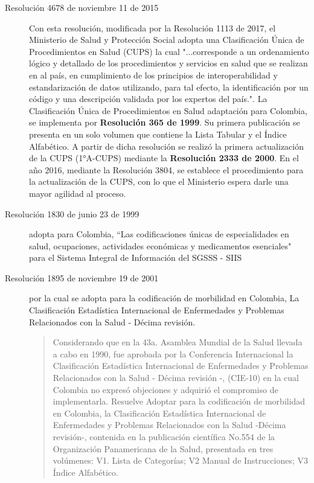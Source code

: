 \begin{description}
\item[Resolución 4678 de noviembre 11 de 2015] Con esta resolución, modificada por la Resolución 1113 de 2017, el Ministerio de Salud y Protección Social adopta una Clasificación Única de Procedimientos en Salud (CUPS) la cual "...corresponde a un ordenamiento lógico y detallado de los procedimientos y servicios en salud que se realizan en al país, en cumplimiento de los principios de interoperabilidad y estandarización de datos utilizando, para tal efecto, la identificación por un código y una descripción validada por los expertos del país."\cite{minsalud4678}. La Clasificación Única de Procedimientos en Salud adaptación para Colombia, se implementa por \textbf{Resolución 365 de 1999}. Su primera publicación se presenta en un solo volumen que contiene la Lista Tabular y el Índice Alfabético. A partir de dicha resolución se realizó la primera actualización de la CUPS (1°A-CUPS) mediante la \textbf{Resolución 2333 de 2000}. En el año 2016, mediante la Resolución 3804, se establece el procedimiento para la actualización de la CUPS, con lo que el Ministerio espera darle una mayor agilidad al proceso.

\item[Resolución 1830 de junio 23 de 1999] adopta para Colombia, “Las codificaciones únicas de especialidades en salud, ocupaciones, actividades económicas y medicamentos esenciales" para el Sistema Integral de Información del SGSSS - SIIS 

\item[Resolución 1895 de noviembre 19 de 2001] por la cual se adopta para la codificación de morbilidad en Colombia, La Clasificación Estadística Internacional de Enfermedades y Problemas Relacionados con la Salud - Décima revisión. 

\begin{quote}
Considerando que en la 43a. Asamblea Mundial de la Salud llevada a cabo en 1990, fue aprobada por la Conferencia Internacional la Clasificación Estadística Internacional de Enfermedades y Problemas Relacionados con la Salud - Décima revisión -, (CIE-10) en la cual Colombia no expresó objeciones y adquirió el compromiso de implementarla. Resuelve Adoptar para la codificación de morbilidad en Colombia, la Clasificación Estadística Internacional de Enfermedades y Problemas Relacionados con la Salud -Décima revisión-, contenida en la publicación científica No.554 de la Organización Panamericana de la Salud, presentada en tres volúmenes: V1. Lista de Categorías; V2 Manual de Instrucciones; V3 Índice Alfabético.\end{quote} 


\end{description}
